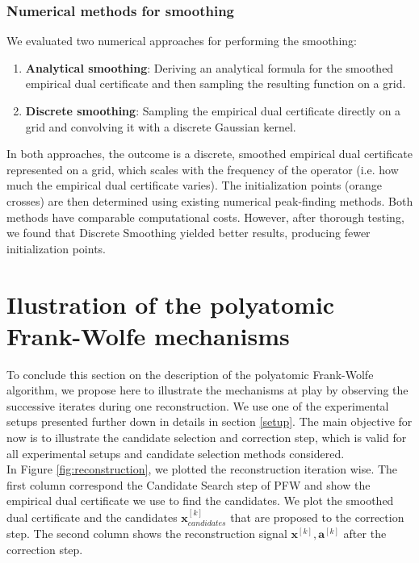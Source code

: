 \documentclass[a4paper,12pt,oneside]{report}
\theoremstyle{named}
\begin{document}
\subsubsection{Numerical methods for smoothing}
We evaluated two numerical approaches for performing the smoothing:

\begin{enumerate}
    \item \textbf{Analytical smoothing}: Deriving an analytical formula for the smoothed empirical dual certificate and then sampling the resulting function on a grid.
    \item \textbf{Discrete smoothing}: Sampling the empirical dual certificate directly on a grid and convolving it with a discrete Gaussian kernel.
\end{enumerate}

In both approaches, the outcome is a discrete, smoothed empirical dual certificate represented on a grid, which scales with the frequency of the operator (i.e. how much the empirical dual certificate varies). The initialization points (orange crosses) are then determined using existing numerical peak-finding methods. Both methods have comparable computational costs. However, after thorough testing, we found that Discrete Smoothing yielded better results, producing fewer initialization points.

\section{Ilustration of the polyatomic Frank-Wolfe mechanisms}
To conclude this section on the description of the polyatomic Frank-Wolfe algorithm, we propose here to illustrate the mechanisms at play by observing the successive iterates during one reconstruction. We use one of the experimental setups presented further down in details in section \ref{setup}. The main objective for now is to illustrate the candidate selection and correction step, which is valid for all experimental setups and candidate selection methods considered. \\

In Figure \ref{fig:reconstruction}, we plotted the reconstruction iteration wise. The first column correspond the Candidate Search step of PFW and show the empirical dual certificate we use to find the candidates. We plot the smoothed dual certificate and the candidates $\mathbf{x}^{[k]}_{candidates}$ that are proposed to the correction step. The second column shows the reconstruction signal $\mathbf{x}^{[k]}, \mathbf{a}^{[k]}$ after the correction step. \\
\end{document}
